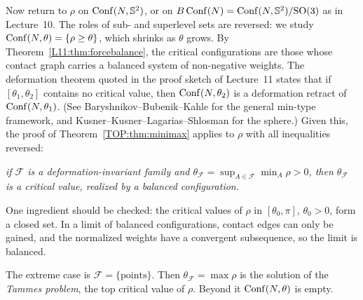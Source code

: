 Now return to $\rho$ on $\operatorname{Conf}(N,\mathbb{S}^2)$, or on $B\operatorname{Conf}(N)=\operatorname{Conf}(N,\mathbb{S}^2)/\mathrm{SO}(3)$ as in Lecture~10. The
roles of sub- and superlevel sets are reversed: we study $\operatorname{Conf}(N,\theta)=\{\rho\ge\theta\}$, which shrinks
as $\theta$ grows. By Theorem~\ref{L11:thm:forcebalance}, the critical configurations are those whose
contact graph carries a balanced system of non-negative weights. The deformation theorem quoted in the
proof sketch of Lecture~11 states that if $[\theta_1,\theta_2]$ contains no critical value, then
$\operatorname{Conf}(N,\theta_2)$ is a deformation retract of $\operatorname{Conf}(N,\theta_1)$. (See Baryshnikov--Bubenik--Kahle for
the general min-type framework, and Kusner--Kusner--Lagarias--Shlosman for the sphere.) Given this, the proof
of Theorem~\ref{TOP:thm:minimax} applies to $\rho$ with all inequalities reversed:
\begin{center}
\emph{if $\mathcal F$ is a deformation-invariant family and
$\theta_{\mathcal F}=\sup_{A\in\mathcal F}\min_A\rho>0$, then $\theta_{\mathcal F}$ is a critical value,
realized by a balanced configuration.}
\end{center}
One ingredient should be checked: the critical values of $\rho$ in $[\theta_0,\pi]$, $\theta_0>0$, form a
closed set. In a limit of balanced configurations, contact edges can only be gained, and the normalized
weights have a convergent subsequence, so the limit is balanced.

The extreme case is $\mathcal F=\{\text{points}\}$. Then $\theta_{\mathcal F}=\max\rho$ is the solution of
the \emph{Tammes problem}, the top critical value of $\rho$. Beyond it $\operatorname{Conf}(N,\theta)$ is empty.

